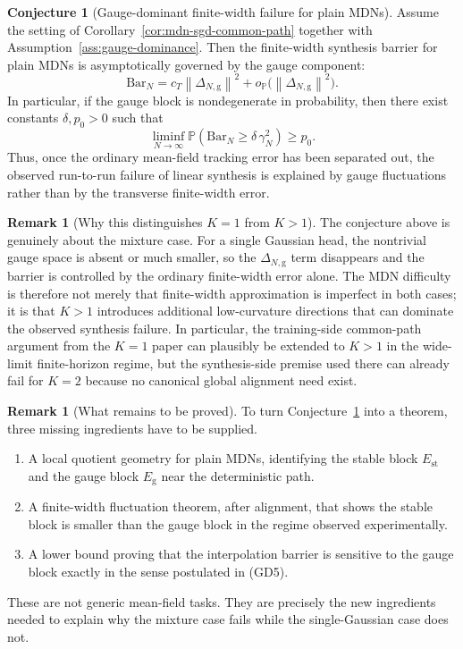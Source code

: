\documentclass[11pt]{article}
\theoremstyle{definition}
\newtheorem{remark}[theorem]{Remark}
\newtheorem{conjecture}[theorem]{Conjecture}
\newcommand{\Prob}{\mathbb{P}}
\newcommand{\norm}[1]{\left\lVert #1 \right\rVert}
\begin{document}
\begin{conjecture}[Gauge-dominant finite-width failure for plain MDNs]
\label{conj:gauge-dominance}
Assume the setting of Corollary~\ref{cor:mdn-sgd-common-path} together with
Assumption~\ref{ass:gauge-dominance}. Then the finite-width synthesis barrier
for plain MDNs is asymptotically governed by the gauge component:
\[
  \mathrm{Bar}_N
  =
  c_T \norm{\Delta_{N,\mathrm{g}}}^2
  +
  o_{\Prob}\!\big(\norm{\Delta_{N,\mathrm{g}}}^2\big).
\]
In particular, if the gauge block is nondegenerate in probability, then there
exist constants $\delta,p_0>0$ such that
\[
  \liminf_{N\to\infty}
  \Prob\!\left(
    \mathrm{Bar}_N \ge \delta\,\gamma_N^2
  \right)
  \ge
  p_0.
\]
Thus, once the ordinary mean-field tracking error has been separated out, the
observed run-to-run failure of linear synthesis is explained by gauge
fluctuations rather than by the transverse finite-width error.
\end{conjecture}

\begin{remark}[Why this distinguishes $K=1$ from $K>1$]
The conjecture above is genuinely about the mixture case. For a single Gaussian
head, the nontrivial gauge space is absent or much smaller, so the
$\Delta_{N,\mathrm{g}}$ term disappears and the barrier is controlled by the
ordinary finite-width error alone. The MDN difficulty is therefore not merely
that finite-width approximation is imperfect in both cases; it is that
$K>1$ introduces additional low-curvature directions that can dominate the
observed synthesis failure. In particular, the training-side common-path
argument from the $K=1$ paper can plausibly be extended to $K>1$ in the
wide-limit finite-horizon regime, but the synthesis-side premise used there can
already fail for $K=2$ because no canonical global alignment need exist.
\end{remark}

\begin{remark}[What remains to be proved]
To turn Conjecture~\ref{conj:gauge-dominance} into a theorem, three missing
ingredients have to be supplied.
\begin{enumerate}[label=(\alph*)]
  \item A local quotient geometry for plain MDNs, identifying the stable block
  $E_{\mathrm{st}}$ and the gauge block $E_{\mathrm{g}}$ near the deterministic
  path.
  \item A finite-width fluctuation theorem, after alignment, that shows the
  stable block is smaller than the gauge block in the regime observed
  experimentally.
  \item A lower bound proving that the interpolation barrier is sensitive to the
  gauge block exactly in the sense postulated in (GD5).
\end{enumerate}
These are not generic mean-field tasks. They are precisely the new ingredients
needed to explain why the mixture case fails while the single-Gaussian case does
not.
\end{remark}
\end{document}
